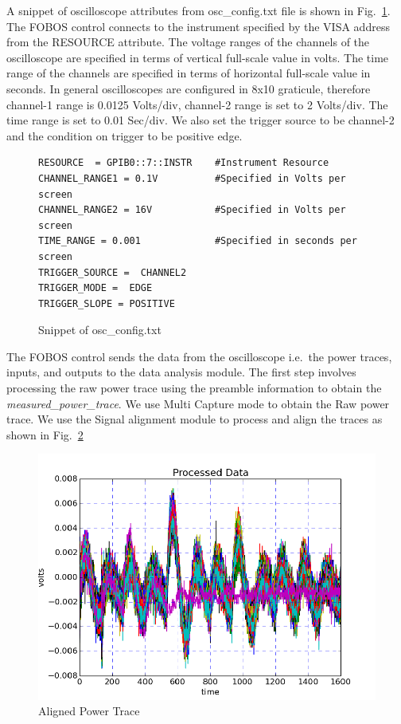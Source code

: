 \documentclass{llncs}
\numberwithin{algorithm}{chapter}
\begin{document}
A snippet of oscilloscope attributes from osc\_config.txt file is shown in Fig.~\ref{fig:fobos:osccon}.
The FOBOS control connects to the instrument specified by the VISA address from the RESOURCE attribute.
The voltage ranges of the channels of the oscilloscope are specified in terms of vertical full-scale 
value in volts. The time range of the channels are specified in terms of horizontal full-scale
value in seconds. In general oscilloscopes are configured in 8x10 graticule, therefore channel-1 range 
is 0.0125 Volts/div, channel-2 range is set to 2 Volts/div. The time range is set to 0.01 Sec/div. We also set
the trigger source to be channel-2 and the condition on trigger to be positive edge.

\begin{figure}[H]
\begin{Verbatim}[frame=single]
RESOURCE  = GPIB0::7::INSTR    #Instrument Resource
CHANNEL_RANGE1 = 0.1V          #Specified in Volts per screen
CHANNEL_RANGE2 = 16V           #Specified in Volts per screen
TIME_RANGE = 0.001             #Specified in seconds per screen
TRIGGER_SOURCE =  CHANNEL2
TRIGGER_MODE =  EDGE  
TRIGGER_SLOPE = POSITIVE
\end{Verbatim}
\caption{\label{fig:fobos:osccon}Snippet of osc\_config.txt}
\end{figure}

The FOBOS control sends the data from the oscilloscope i.e.\ the power traces, inputs, and outputs to
the data analysis module. The first step involves processing the raw 
power trace using the preamble information to obtain the \emph{measured\_power\_trace}.
We use Multi Capture mode to obtain the Raw power trace. We use the Signal alignment 
module to process and align the traces as shown in Fig.~\ref{fig:alpt}


\begin{figure}[H]
\begin{center}
\includegraphics[scale=0.8]{figures/scaTrace1}
\caption{\label{fig:alpt}Aligned Power Trace}
\end{center} 
\vspace{-3ex}
\end{figure}
\end{document}
